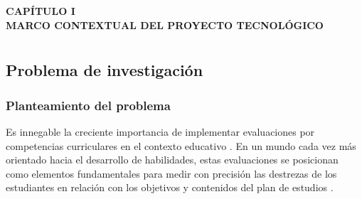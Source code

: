 
\cleardoublepage
\thispagestyle{empty}
\vspace*{\fill}
\begin{center}
{\Large\bfseries CAPÍTULO I}\\[2.5cm]
{\Large\bfseries MARCO CONTEXTUAL DEL PROYECTO TECNOLÓGICO}
\end{center}
\vspace*{\fill}
\clearpage

\chapter*{}
\setcounter{chapter}{1}
\setcounter{section}{0}
\renewcommand{\thesection}{1.\arabic{section}}
\renewcommand{\thesubsection}{1.\arabic{section}.\arabic{subsection}}
\renewcommand{\thesubsubsection}{1.\arabic{section}.\arabic{subsection}.\arabic{subsubsection}}

\vspace{-3cm}

\section{Problema de investigación}

\subsection{Planteamiento del problema}

Es innegable la creciente importancia de implementar evaluaciones por competencias curriculares en el contexto educativo \cite{ref02_tobon}. En un mundo cada vez más orientado hacia el desarrollo de habilidades, estas evaluaciones se posicionan como elementos fundamentales para medir con precisión las destrezas de los estudiantes en relación con los objetivos y contenidos del plan de estudios \cite{ref01_evalcompetencias,ref12_zabalza}.

